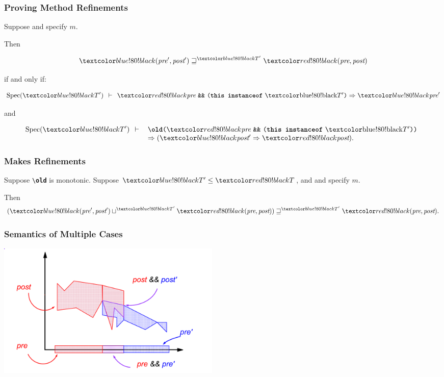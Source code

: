 \begin{frame}
\frametitle{Proving Method Refinements}
\begin{theorem}
\label{th:refinement}
Suppose  and 
specify $m$.

Then 

\begin{displaymath}
\BLUE{(\pre',\post')} \refines^{\BLUETP} \RED{(\pre,\post)}
\end{displaymath}

if and only if:

\begin{displaymath}
\Spec{{\BLUETP}} \Proves
 \RED{\pre} \mbox{ \texttt{\&\&} }
          \mbox{\texttt{(}\textbf{\texttt{this instanceof}} \BLUETP\texttt{)}}
 \Rightarrow \BLUE{\pre'}
\end{displaymath}

and

\begin{displaymath}
\Spec{{\BLUETP}} \Proves
\begin{array}[t]{l}
\mbox{\texttt{{\textbackslash}\textbf{old}(}}\RED{\pre}
   \mbox{ \texttt{\&\&} }
   \mbox{\texttt{(}\textbf{\texttt{this instanceof}} \BLUETP\texttt{))}} \\
   \Rightarrow (\BLUE{\post'} \Rightarrow \RED{\post}).
\end{array}
\end{displaymath}
\end{theorem}
\end{frame}

\begin{frame}
\frametitle{ Makes Refinements}

\begin{theorem}
Suppose \mbox{\texttt{{\textbackslash}\textbf{old}}}
is monotonic.
Suppose $\BLUETP \STO \REDT$, and
 and 
specify $m$.

Then 
\begin{displaymath}
(\BLUE{(\pre',\post')} \join^{\BLUETP} \RED{(\pre,\post)}) 
  \refines^{\BLUETP} \RED{(\pre,\post)}.
\end{displaymath}
\end{theorem}
\end{frame}

\begin{frame}
\frametitle{Semantics of Multiple Cases}
\transdissolve[duration=0.5]
\includegraphics[width=4.25in]{join-both}
\end{frame}

